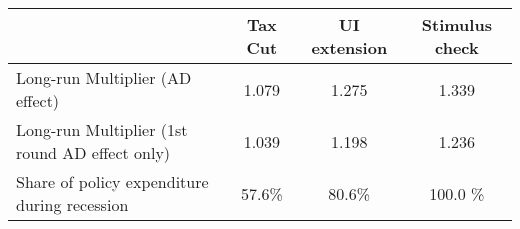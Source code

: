 \begin{tabular}{@{}lccc@{}} 
\toprule 
& Tax Cut    & UI extension    & Stimulus check    \\  \midrule 
Long-run Multiplier (AD effect) &1.079  & 1.275  & 1.339     \\ 
Long-run Multiplier (1st round AD effect only) &1.039  & 1.198  & 1.236     \\ 
Share of policy expenditure during recession &57.6\%  & 80.6\%  & 100.0 \%    \\ 
\end{tabular}  

